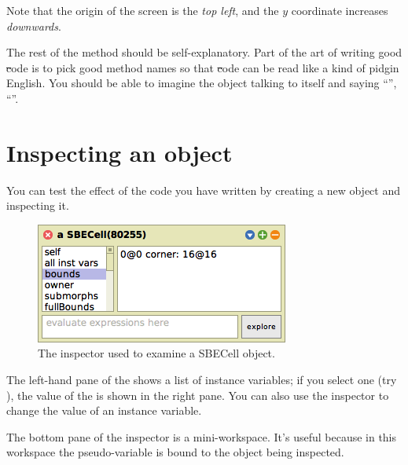 \documentclass[a4paper,10pt,twoside]{book}
\begin{document}
Note that the origin of the \sq screen is the \emph{top left}, and the $y$ coordinate increases \emph{downwards}.

The rest of the method should be self-explanatory.
Part of the art of writing good \st code is to pick good method names so that \st code can be read like a kind of pidgin English.
You should be able to imagine the object talking to itself and saying ``'', ``''.

\section{Inspecting an object}

You can test the effect of the code you have written by creating a new  object and inspecting it.


\begin{figure}[htbp]
   \centering
   \includegraphics[scale=0.7]{SBECellInspector} 
   \caption{The inspector used to examine a SBECell object.\label{fig:SBECellInspector}}
\end{figure}

The left-hand pane of the  shows a list of instance variables; if you select one (try \mbox{),} the value of the  is shown in the right pane.  You can also use the inspector to change the value of an instance variable.


The bottom pane of the inspector is a mini-workspace.  It's useful because in this workspace the pseudo-variable \self is bound to the object being inspected. 
\end{document}
